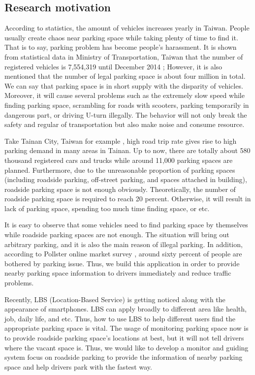 \documentclass[runningheads,a4paper]{llncs}
\begin{document}
\begin{CJK}{UTF8}{bsmi}
%
\subsection{Research motivation}
%
According to statistics, the amount of vehicles increases yearly in
Taiwan. People usually create chaos near parking space while taking
plenty of time to find it. That is to say, parking problem has become
people's harassment. It is shown from statistical data in Ministry of
Transportation, Taiwan that the number of registered vehicles is
7,554,319 until December 2014 \cite{motc}; However, it is also mentioned that
the number of legal parking space is about four million in total. We can say that
parking space is in short supply with the disparity of vehicles.
Moreover, it will cause several problems such as the extremely slow
speed while finding parking space, scrambling for roads with scooters,
parking temporarily in dangerous part, or driving U-turn illegally. The
behavior will not only break the safety and regular of transportation
but also make noise and consume resource.

Take Tainan City, Taiwan for example \cite{strategyTainan}, high road trip rate gives rise
to high parking demand in many areas in Tainan. Up to now, there are
totally about 580 thousand registered cars and trucks while around
11,000 parking spaces are planned. Furthermore, due to the unreasonable
proportion of parking spaces (including roadside parking, off-street
parking, and spaces attached in building), roadside parking space is not
enough obviously. Theoretically, the number of roadside parking space is
required to reach 20 percent. Otherwise, it will result in lack of
parking space, spending too much time finding space, or etc.

It is easy to observe that some vehicles need to find parking space by
themselves while roadside parking spaces are not enough. The situation
will bring out arbitrary parking, and it is also the main reason of
illegal parking. In addition, according to Pollster online market survey
\cite{Pollster}, around sixty percent of people are bothered by parking issue. Thus,
we build this application in order to provide nearby parking space
information to drivers immediately and reduce traffic problems.

Recently, LBS (Location-Based Service) \cite{LBS} is getting noticed along with
the appearance of smartphones. LBS can apply broadly to different area
like health, job, daily life, and etc. Thus, how to use LBS to help
different users find the appropriate parking space is vital. The usage
of monitoring parking space now is to provide roadside parking space's
locations at best, but it will not tell drivers where the vacant space
is. Thus, we would like to develop a monitor and guiding system focus on
roadside parking to provide the information of nearby parking space and
help drivers park with the fastest way.



\end{CJK}
\end{document}
